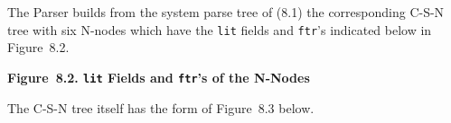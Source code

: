 \documentclass{article}
\begin{document}
The Parser builds from the system parse tree of (8.1) the
corresponding C-S-N tree with six N-nodes which have the
\texttt{lit} fields and \texttt{ftr}'s indicated below in
Figure~8.2.

\bigbreak
\begin{minipage}{\textwidth}
\bigbreak
\textbf{Figure~8.2. \texttt{lit} Fields and \texttt{ftr}'s of the N-Nodes}
\end{minipage}
\bigbreak

The C-S-N tree itself has the form of Figure~8.3 below.
\end{document}
